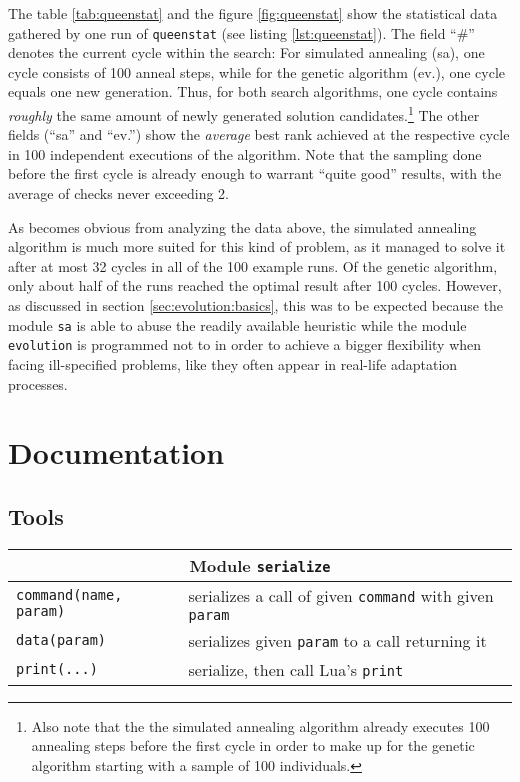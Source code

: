 \begin{appendices}
The table \ref{tab:queenstat} and the figure \ref{fig:queenstat} show the statistical data gathered by one run of \texttt{queenstat} (see listing \ref{lst:queenstat}). The field ``\#'' denotes the current cycle within the search: For simulated annealing (sa), one cycle consists of 100 anneal steps, while for the genetic algorithm (ev.), one cycle equals one new generation. Thus, for both search algorithms, one cycle contains \emph{roughly} the same amount of newly generated solution candidates.\footnote{Also note that the the simulated annealing algorithm already executes 100 annealing steps before the first cycle in order to make up for the genetic algorithm starting with a sample of 100 individuals.} The other fields (``sa'' and ``ev.'') show the \emph{average} best rank achieved at the respective cycle in 100 independent executions of the algorithm. Note that the sampling done before the first cycle is already enough to warrant ``quite good'' results, with the average of checks never exceeding 2.

As becomes obvious from analyzing the data above, the simulated annealing algorithm is much more suited for this kind of problem, as it managed to solve it after at most 32 cycles in all of the 100 example runs. Of the genetic algorithm, only about half of the runs reached the optimal result after 100 cycles. However, as discussed in section \ref{sec:evolution:basics}, this was to be expected because the module \texttt{sa} is able to abuse the readily available heuristic while the module \texttt{evolution} is programmed not to in order to achieve a bigger flexibility when facing ill-specified problems, like they often appear in real-life adaptation processes.

\chapter{Documentation}

\section{Tools}

\begin{table}[H]
\begin{tabular}{|p{5cm}|p{8cm}|}
\hline
\multicolumn{2}{|c|}{Module \texttt{serialize}}\\
\hline
\hline
\texttt{command(name, param)} & serializes a call of given \texttt{command} with given \texttt{param}\\
\hline
\texttt{data(param)} & serializes given \texttt{param} to a call returning it\\
\hline
\texttt{print(...)} & serialize, then call Lua's \texttt{print}\\
\hline
\end{tabular}
\end{table}


\end{appendices}
